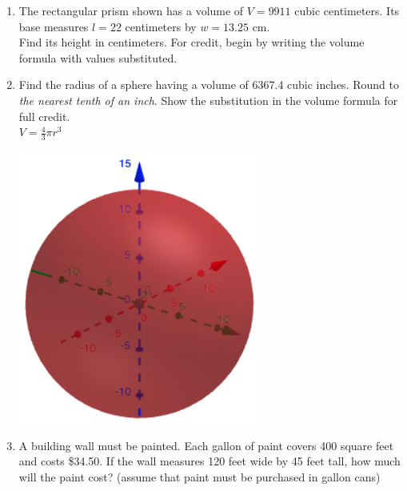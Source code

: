 \documentclass[12pt, twoside]{article}
\begin{document}
\begin{enumerate}
\newpage
\item The rectangular prism shown has a volume of $V=9911$ cubic centimeters. Its base measures $l=22$ centimeters by $w=13.25$ cm. \\[0.5cm]
Find its height in centimeters. For credit, begin by writing the volume formula with values substituted.
\begin{flushright}
\end{flushright}

\newpage
\item Find the radius of a sphere having a volume of 6367.4 cubic inches. Round to \emph{the nearest tenth of an inch}. Show the substitution in the volume formula for full credit. \\[0.5cm]
$\displaystyle V = \frac{4}{3} \pi r^3$
  \begin{flushright}
    \includegraphics[width=8cm]{6-15-9-sphere.png}
  \end{flushright}

\newpage
\item A building wall must be painted. Each gallon of paint covers 400 square feet and costs \$34.50. If the wall measures 120 feet wide by 45 feet tall, how much will the paint cost? (assume that paint must be purchased in gallon cans)

\end{enumerate}
\end{document}
